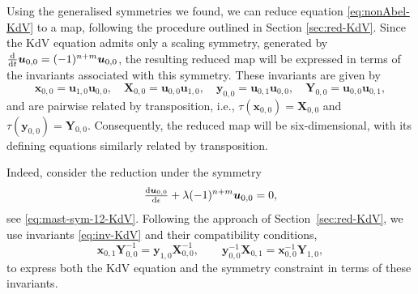 \documentclass[dvips,10pt]{article}
\newcommand{\bs}{\boldsymbol}
\newcommand{\bsu}{ {\bs{u}}}
\newcommand{\bsx}{ {\bs{x}}}
\newcommand{\bsy}{ {\bs{y}}}
\newcommand{\bsX}{ {\bs{X}}}
\newcommand{\bsY}{ {\bs{Y}}}
\theoremstyle{remark} %
\begin{document}
	Using the generalised symmetries we found, we can reduce equation \eqref{eq:nonAbel-KdV} to a map, following the procedure outlined in Section \ref{sec:red-KdV}. Since the KdV equation admits only a scaling symmetry, generated by $\tfrac{{\rm d}}{{\rm d}t} \bsu_{0,0} = (-1)^{n+m} \bsu_{0,0}$, the resulting reduced map will be expressed in terms of the invariants associated with this symmetry. These invariants are given by
	\begin{equation} \label{eq:inv-KdV}
	 {\bs{x}}_{0,0} = \bsu_{1,0} \bsu_{0,0}, \quad {\bs{X}}_{0,0} = \bsu_{0,0} \bsu_{1,0}, \quad {\bs{y}}_{0,0} = \bsu_{0,1} \bsu_{0,0}, \quad {\bs{Y}}_{0,0} = \bsu_{0,0} \bsu_{0,1},
	 \end{equation}
	and are pairwise related by transposition, i.e., $\tau(\bsx_{0,0}) = \bsX_{0,0}$ and $\tau(\bsy_{0,0}) = \bsY_{0,0}$. Consequently, the reduced map will be six-dimensional, with its defining equations similarly related by transposition.
	
	Indeed, consider the reduction under the symmetry 
\[
\tfrac{{\rm{d}} {\bs{u}}_{0,0}}{{\rm{d}} \epsilon} + \lambda (-1)^{n+m} \bsu_{0,0} = 0,
\]
see \eqref{eq:mast-sym-12-KdV}. Following the approach of  Section~\ref{sec:red-KdV}, we use invariants \eqref{eq:inv-KdV} and their compatibility conditions,
\[
\bsx_{0,1} \bsY_{0,0}^{-1} = \bsy_{1,0} \bsX_{0,0}^{-1}, \qquad \bsy_{0,0}^{-1} \bsX_{0,1} = \bsx_{0,0}^{-1} \bsY_{1,0},
\]
to express both the KdV equation and the symmetry constraint in terms of these invariants.
\end{document}
